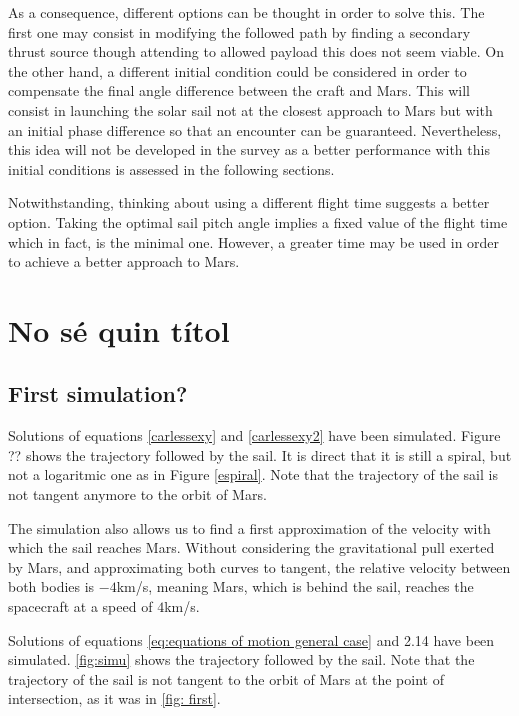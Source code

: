 \documentclass[twocolumn,12pt,a4paper]{article}
\numberwithin{equation}{section}
\begin{document}
 As a consequence, different options can be thought in order to solve this. The first one may consist in modifying the followed path by finding a secondary thrust source though attending to allowed payload this does not seem viable. On the other hand, a different initial condition could be considered in order to compensate the final angle difference between the craft and Mars. This will consist in launching the solar sail not at the closest approach to Mars but with an initial phase difference so that an encounter can be guaranteed. Nevertheless, this idea will not be developed in the survey as a better performance with this initial conditions is assessed in the following sections.
 
 Notwithstanding, thinking about using a different flight time suggests a better option. Taking the optimal sail pitch angle implies a fixed value of the flight time which in fact, is the minimal one. However, a greater time may be used in order to achieve a better approach to Mars.
\section{No sé quin títol}
\subsection{First simulation?}
Solutions of equations \ref{carlessexy} and \ref{carlessexy2} have been simulated. Figure ?? shows the trajectory followed by the sail. It is direct that it is still a spiral, but not a logaritmic one as in Figure \ref{espiral}. Note that the trajectory of the sail is not tangent anymore to the orbit of Mars.

The simulation also allows us to find a first approximation of the velocity with which the sail reaches Mars. Without considering the gravitational pull exerted by Mars, and approximating both curves to tangent, the relative velocity between both bodies is $-4$km/s, meaning Mars, which is behind the sail, reaches the spacecraft at a speed of $4$km/s.

Solutions of equations \ref{eq:equations of motion general case} and 2.14 have been simulated. \autoref{fig:simu} shows the trajectory followed by the sail. Note that the trajectory of the sail is not tangent to the orbit of Mars at the point of intersection, as it was in \autoref{fig: first}.
\end{document}
